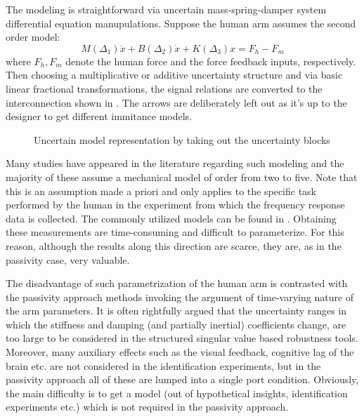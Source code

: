 The modeling is straightforward via uncertain mass-spring-damper system differential equation manupulations. Suppose the human arm
assumes the second order model: 
\[
M(\Delta_1)\ddot{x} + B(\Delta_2)\dot{x} + K(\Delta_3)x = F_h -F_m
\] 
where $F_h,F_m$ denote the human force and the force feedback inputs, respectively. Then choosing a multiplicative or additive uncertainty 
structure and via basic linear fractional transformations, the signal relations are converted to the interconnection shown in 
. The arrows are deliberately left out as it's up to the designer to get different immitance models.
\begin{figure}%
\centering
{}
\caption{Uncertain model representation by taking out the uncertainty blocks}%
\label{fig:lit:figunc}%
\end{figure}


Many studies have appeared in the literature regarding such modeling and the majority of these assume a 
mechanical model of order from two to five. Note that this is an assumption made a priori and only applies 
to the specific task performed by the human in the experiment from which the frequency response data is 
collected. The commonly utilized models can be found in \cite{kazeroonitsay,tsujigoto,kosuge,colgate1,speich,
fucavus,buergerhogan1,leungfa,husalculoewen,andrifour,laroche}. 
Obtaining these measurements are time-consuming and difficult to parameterize. For this reason, although
the results along this direction are scarce, they are, as in the passivity case, very valuable. 

The disadvantage of such parametrization of the human arm is contrasted with the passivity approach methods
invoking the argument of time-varying nature of the arm parameters. It is often rightfully argued that the 
uncertainty ranges in which the stiffness and damping (and partially inertial) coefficients change, are too 
large to be considered in the structured singular value based robustness tools. Moreover, many auxiliary 
effects such as the visual feedback, cognitive lag of the brain etc. are not considered in the identification 
experiments, but in the passivity approach all of these are lumped into a single port condition. Obviously, 
the main difficulty is to get a model (out of hypothetical insights, identification experiments etc.) which is
not required in the passivity approach.

